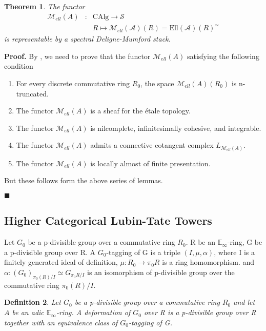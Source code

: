 \documentclass[12pt]{article}
\newtheorem{theorem}{Theorem}[section] %
\theoremstyle{thry}
\newtheorem{definition}[theorem]{Definition}
\renewenvironment{proof}
{\par \noindent \textbf{Proof.}}
{ \par \hfill $\blacksquare$ \quad \par }
\def  \CAlg     {\mathrm{CAlg}}
\def  \Ell      {\mathrm{Ell}}
\def  \ca       {\mathcal{A}}
\def  \cm       {\mathcal{M}}
\def  \cs       {\mathcal{S}}
\def  \be       {\mathbb{E}}
\begin{document}
\begin{theorem}The functor
	\begin{eqnarray*}
		\cm_{ell}(A) & : &\CAlg \to    \cs  \\	                       
		&  & R  \longmapsto      \cm_{ell}(\ca)(R)=\Ell(\ca)(R)^{\simeq}   
	\end{eqnarray*}
	is representable by a spectral Deligne-Mumford stack.
\end{theorem}
\begin{proof}
	By \cite[Theroem 18.3.0.1]{lu-SAG}, we need to prove that the functor $\cm_{ell}(A)$ satisfying the following condition
	\begin{enumerate}
		\item For every discrete commutative ring $R_0$, the space $\cm_{ell}(A)(R_0)$ is n-truncated.
		\item The functor $\cm_{ell}(A)$ is a sheaf for the \'etale topology.
		\item The functor $\cm_{ell}(A)$ is nilcomplete, infinitesimally cohesive, and integrable.
		\item The functor $\cm_{ell}(A)$ admits a connective cotangent complex $L_{\cm_{ell}(A)}$.
		\item The functor $\cm_{ell}(A)$ is locally almost of finite presentation.
	\end{enumerate}	
	But these follows form the above series of lemmas.
\end{proof}



\subsection{Higher Categorical Lubin-Tate Towers}
Let $G_0$ be a p-divisible group over a commutative ring $R_0$.  R be an $\be_{\infty}$-ring,  G be a p-divisible group over R. A $G_0$-tagging of G is a triple $(I, \mu, \alpha)$, where I is a finitely generated ideal of definition, $\mu: R_0 \to \pi_0 R$ is a ring homomorphism. and $\alpha: (G_0)_{\pi_0(R)/I} \simeq G_{\pi_0 R/I}$ is an isomorphism of p-divisible group over the commutative ring $\pi_0(R)/I$.

\begin{definition}
	Let $G_0$ be a p-divisible group over  a commutative ring $R_0$ and let $A$ be an adic $\be_{\infty}$-ring.  A deformation of $G_0$ over R  is a  p-divisible group over R together with an equivalence class of $G_0$-tagging  of G. 
\end{definition}
\end{document}

